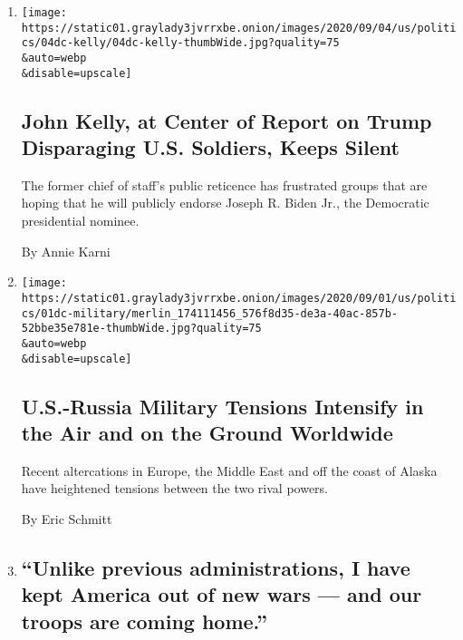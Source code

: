 \begin{enumerate}
\def\labelenumi{\arabic{enumi}.}
\item
  \href{/2020/09/04/us/politics/kelly-trump.html}{}

  \texttt{[image: https://static01.graylady3jvrrxbe.onion/images/2020/09/04/us/politics/04dc-kelly/04dc-kelly-thumbWide.jpg?quality=75\\\&auto=webp\\\&disable=upscale]}

  \hypertarget{john-kelly-at-center-of-report-on-trump-disparaging-us-soldiers-keeps-silent}{%
  \subsection{John Kelly, at Center of Report on Trump Disparaging U.S.
  Soldiers, Keeps
  Silent}\label{john-kelly-at-center-of-report-on-trump-disparaging-us-soldiers-keeps-silent}}

  The former chief of staff's public reticence has frustrated groups
  that are hoping that he will publicly endorse Joseph R. Biden Jr., the
  Democratic presidential nominee.

  By Annie Karni
\item
  \href{/2020/09/01/us/politics/us-russia-military-tensions.html}{}

  \texttt{[image: https://static01.graylady3jvrrxbe.onion/images/2020/09/01/us/politics/01dc-military/merlin\_174111456\_576f8d35-de3a-40ac-857b-52bbe35e781e-thumbWide.jpg?quality=75\\\&auto=webp\\\&disable=upscale]}

  \hypertarget{us-russia-military-tensions-intensify-in-the-air-and-on-the-ground-worldwide}{%
  \subsection{U.S.-Russia Military Tensions Intensify in the Air and on
  the Ground
  Worldwide}\label{us-russia-military-tensions-intensify-in-the-air-and-on-the-ground-worldwide}}

  Recent altercations in Europe, the Middle East and off the coast of
  Alaska have heightened tensions between the two rival powers.

  By Eric Schmitt
\item
  \href{/live/2020/08/27/us/rnc-fact-check/unlike-previous-administrations-i-have-kept-america-out-of-new-wars-and-our-troops-are-coming-home}{}

  \hypertarget{unlike-previous-administrations-i-have-kept-america-out-of-new-wars--and-our-troops-are-coming-home}{%
  \subsection{``Unlike previous administrations, I have kept America out
  of new wars --- and our troops are coming
  home.''}\label{unlike-previous-administrations-i-have-kept-america-out-of-new-wars--and-our-troops-are-coming-home}}


\end{enumerate}

